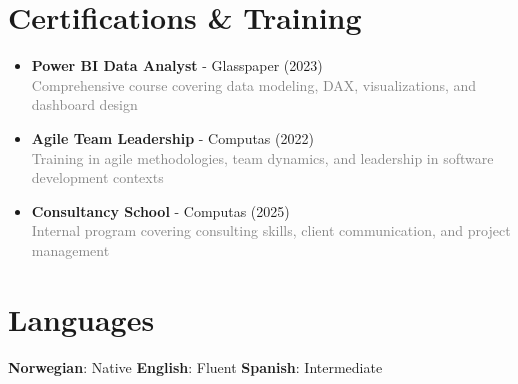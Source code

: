 \documentclass[11pt,a4paper]{article}
\begin{document}
\section{Certifications \& Training}

\begin{itemize}[itemsep=0.5em, leftmargin=*]
\item \textbf{Power BI Data Analyst} - Glasspaper (2023)\\
\textcolor{gray}{Comprehensive course covering data modeling, DAX, visualizations, and dashboard design}
\item \textbf{Agile Team Leadership} - Computas (2022)\\
\textcolor{gray}{Training in agile methodologies, team dynamics, and leadership in software development contexts}
\item \textbf{Consultancy School} - Computas (2025)\\
\textcolor{gray}{Internal program covering consulting skills, client communication, and project management}
\end{itemize}

\vspace{5pt}

\section{Languages}
\textbf{Norwegian}: Native \quad \textbf{English}: Fluent \quad \textbf{Spanish}: Intermediate
\end{document}
